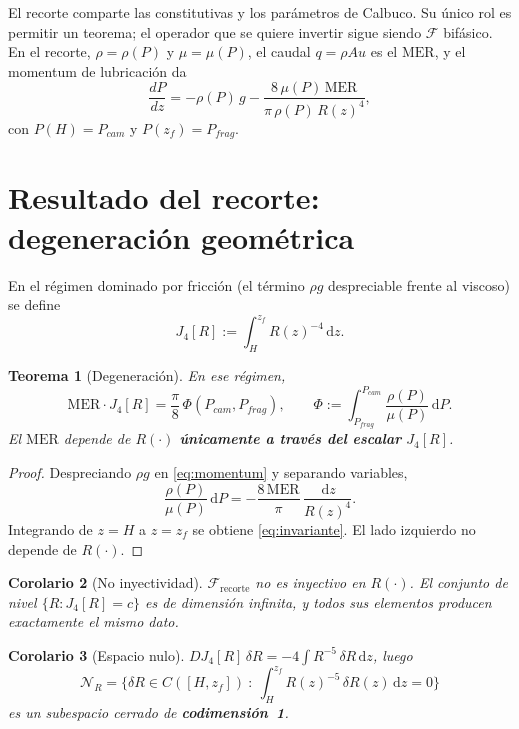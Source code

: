 \documentclass[11pt,a4paper]{article}
\theoremstyle{plain}
\newtheorem{teorema}{Teorema}
\newtheorem{corolario}[teorema]{Corolario}
\theoremstyle{definition}
\theoremstyle{remark}
\newcommand{\MER}{\mathrm{MER}}
\newcommand{\dd}{\,\mathrm{d}}
\begin{document}
\vspace{0.4em}
El recorte comparte las constitutivas y los parámetros de Calbuco. Su único
rol es permitir un teorema; el operador que se quiere invertir sigue siendo
$\mathcal{F}$ bifásico. En el recorte, $\rho=\rho(P)$ y $\mu=\mu(P)$, el
caudal $q=\rho A u$ es el $\MER$, y el momentum de lubricación da
\begin{equation}\label{eq:momentum}
\frac{dP}{dz}=-\rho(P)\,g-\frac{8\,\mu(P)\,\MER}{\pi\,\rho(P)\,R(z)^4},
\end{equation}
con $P(H)=P_{cam}$ y $P(z_f)=P_{frag}$.

\section{Resultado del recorte: degeneración geométrica}

En el régimen dominado por fricción (el término $\rho g$ despreciable frente
al viscoso) se define
\begin{equation}
J_4[R]:=\int_H^{z_f}R(z)^{-4}\dd z.
\end{equation}

\begin{teorema}[Degeneración]\label{th:J4}
En ese régimen,
\begin{equation}\label{eq:invariante}
\MER\cdot J_4[R]=\frac{\pi}{8}\,\Phi(P_{cam},P_{frag}),
\qquad
\Phi:=\int_{P_{frag}}^{P_{cam}}\frac{\rho(P)}{\mu(P)}\dd P .
\end{equation}
El $\MER$ depende de $R(\cdot)$ \textbf{únicamente a través del escalar}
$J_4[R]$.
\end{teorema}

\begin{proof}
Despreciando $\rho g$ en \eqref{eq:momentum} y separando variables,
\[
\frac{\rho(P)}{\mu(P)}\dd P=-\frac{8\,\MER}{\pi}\,\frac{\dd z}{R(z)^4}.
\]
Integrando de $z=H$ a $z=z_f$ se obtiene \eqref{eq:invariante}. El lado
izquierdo no depende de $R(\cdot)$.
\end{proof}

\begin{corolario}[No inyectividad]
$\mathcal{F}_{\mathrm{recorte}}$ no es inyectivo en $R(\cdot)$. El conjunto
de nivel $\{R:J_4[R]=c\}$ es de dimensión infinita, y todos sus elementos
producen exactamente el mismo dato.
\end{corolario}

\begin{corolario}[Espacio nulo]
$DJ_4[R]\,\delta R=-4\int R^{-5}\,\delta R\dd z$, luego
\begin{equation}
\mathcal{N}_R=\Big\{\delta R\in C([H,z_f])\ :\ \int_H^{z_f}R(z)^{-5}\,\delta R(z)\dd z=0\Big\}
\end{equation}
es un subespacio cerrado de \textbf{codimensión~1}.
\end{corolario}
\end{document}
